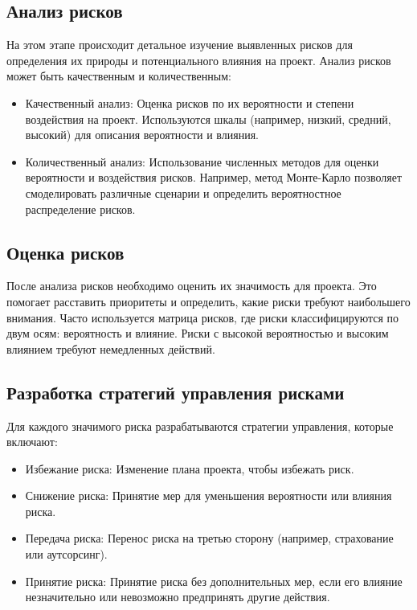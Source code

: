     \subsection{Анализ рисков}
    На этом этапе происходит детальное изучение выявленных рисков для определения их природы и потенциального влияния на проект. Анализ рисков может быть качественным и количественным:

    \begin{itemize}
        \item Качественный анализ: Оценка рисков по их вероятности и степени воздействия на проект. Используются шкалы (например, низкий, средний, высокий) для описания вероятности и влияния.
        \item Количественный анализ: Использование численных методов для оценки вероятности и воздействия рисков. Например, метод Монте-Карло позволяет смоделировать различные сценарии и определить вероятностное распределение рисков.
    \end{itemize}

    \subsection{Оценка рисков}
    После анализа рисков необходимо оценить их значимость для проекта. Это помогает расставить приоритеты и определить, какие риски требуют наибольшего внимания. Часто используется матрица рисков, где риски классифицируются по двум осям: вероятность и влияние. Риски с высокой вероятностью и высоким влиянием требуют немедленных действий.
    
    \subsection{Разработка стратегий управления рисками}
    Для каждого значимого риска разрабатываются стратегии управления, которые включают:

    \begin{itemize}
        \item Избежание риска: Изменение плана проекта, чтобы избежать риск.
        \item Снижение риска: Принятие мер для уменьшения вероятности или влияния риска.
        \item Передача риска: Перенос риска на третью сторону (например, страхование или аутсорсинг).
        \item Принятие риска: Принятие риска без дополнительных мер, если его влияние незначительно или невозможно предпринять другие действия.
    \end{itemize}
    
